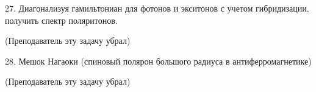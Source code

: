 \documentclass[a4paper,12pt]{article} %
\begin{document}
\begin{ttask}

27. Диагонализуя гамильтониан для фотонов и экситонов с учетом гибридизации, получить спектр поляритонов. 


(Преподаватель эту задачу убрал)












\end{ttask}



\begin{ttask}

28. Мешок Нагаоки (спиновый полярон большого радиуса в антиферромагнетике)

(Преподаватель эту задачу убрал)





\end{ttask}
\end{document}
